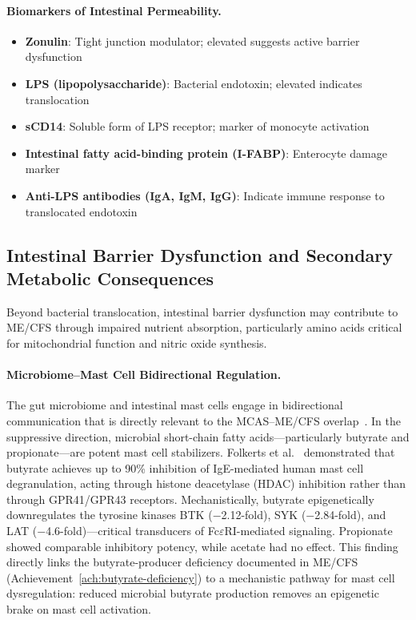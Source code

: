 \paragraph{Biomarkers of Intestinal Permeability.}
\begin{itemize}
    \item \textbf{Zonulin}: Tight junction modulator; elevated suggests active barrier dysfunction
    \item \textbf{LPS (lipopolysaccharide)}: Bacterial endotoxin; elevated indicates translocation
    \item \textbf{sCD14}: Soluble form of LPS receptor; marker of monocyte activation
    \item \textbf{Intestinal fatty acid-binding protein (I-FABP)}: Enterocyte damage marker
    \item \textbf{Anti-LPS antibodies (IgA, IgM, IgG)}: Indicate immune response to translocated endotoxin
\end{itemize}

\subsection{Intestinal Barrier Dysfunction and Secondary Metabolic Consequences}
\label{sec:gut-metabolic-cascade}

Beyond bacterial translocation, intestinal barrier dysfunction may contribute to ME/CFS through impaired nutrient absorption, particularly amino acids critical for mitochondrial function and nitric oxide synthesis.

\paragraph{Microbiome--Mast Cell Bidirectional Regulation.}
\label{par:microbiome-mast-cell}

The gut microbiome and intestinal mast cells engage in bidirectional communication that is directly relevant to the MCAS--ME/CFS overlap~\cite{DeZuani2018mastmicrobiota,Papa2025mastmicrobiome}. In the suppressive direction, microbial short-chain fatty acids---particularly butyrate and propionate---are potent mast cell stabilizers. Folkerts et al.~\cite{Folkerts2020butyrate} demonstrated that butyrate achieves up to 90\% inhibition of IgE-mediated human mast cell degranulation, acting through histone deacetylase (HDAC) inhibition rather than through GPR41/GPR43 receptors. Mechanistically, butyrate epigenetically downregulates the tyrosine kinases BTK ($-$2.12-fold), SYK ($-$2.84-fold), and LAT ($-$4.6-fold)---critical transducers of Fc$\varepsilon$RI-mediated signaling. Propionate showed comparable inhibitory potency, while acetate had no effect. This finding directly links the butyrate-producer deficiency documented in ME/CFS (Achievement~\ref{ach:butyrate-deficiency}) to a mechanistic pathway for mast cell dysregulation: reduced microbial butyrate production removes an epigenetic brake on mast cell activation.

